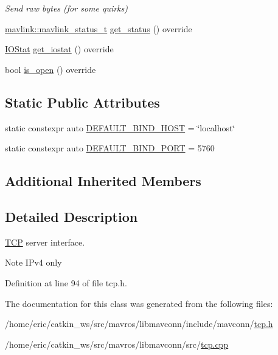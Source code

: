 \begin{DoxyCompactItemize}
\begin{DoxyCompactList}\small\item\em Send raw bytes (for some quirks) \end{DoxyCompactList}\item 
\mbox{\hyperlink{include__v2_80_2mavlink__types_8h_aec6f7af3879252822d8fb108e97aafc2}{mavlink\+::mavlink\+\_\+status\+\_\+t}} \mbox{\hyperlink{group__mavconn_gab139fa8d7e65c0de256f7d9dee0d0f30}{get\+\_\+status}} () override
\item 
\mbox{\hyperlink{structmavconn_1_1MAVConnInterface_1_1IOStat}{I\+O\+Stat}} \mbox{\hyperlink{group__mavconn_ga7fd83c9a2233baa30aff24b6f3c8dd25}{get\+\_\+iostat}} () override
\item 
bool \mbox{\hyperlink{group__mavconn_ga7bcb8a571a040f61ad2b61f002edc381}{is\+\_\+open}} () override
\end{DoxyCompactItemize}
\subsection*{Static Public Attributes}
\begin{DoxyCompactItemize}
\item 
static constexpr auto \mbox{\hyperlink{group__mavconn_gae043843ee4b947094ca58342c442c3b6}{D\+E\+F\+A\+U\+L\+T\+\_\+\+B\+I\+N\+D\+\_\+\+H\+O\+ST}} = \char`\"{}localhost\char`\"{}
\item 
static constexpr auto \mbox{\hyperlink{group__mavconn_gacf9d47d0f198105f4a27c9668ba793b1}{D\+E\+F\+A\+U\+L\+T\+\_\+\+B\+I\+N\+D\+\_\+\+P\+O\+RT}} = 5760
\end{DoxyCompactItemize}
\subsection*{Additional Inherited Members}


\subsection{Detailed Description}
\mbox{\hyperlink{classTCP}{T\+CP}} server interface. 

\begin{DoxyNote}{Note}
I\+Pv4 only 
\end{DoxyNote}


Definition at line 94 of file tcp.\+h.



The documentation for this class was generated from the following files\+:\begin{DoxyCompactItemize}
\item 
/home/eric/catkin\+\_\+ws/src/mavros/libmavconn/include/mavconn/\mbox{\hyperlink{tcp_8h}{tcp.\+h}}\item 
/home/eric/catkin\+\_\+ws/src/mavros/libmavconn/src/\mbox{\hyperlink{tcp_8cpp}{tcp.\+cpp}}\end{DoxyCompactItemize}

